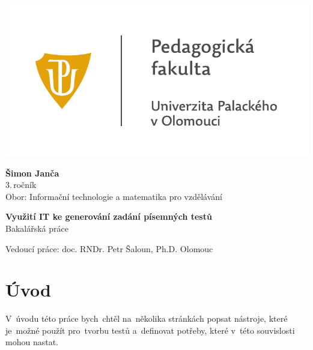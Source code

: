 \documentclass[11pt,a4paper]{report}
\begin{document}
	\begin{titlepage}
		\begin{center}
            {
            \centering
            \includegraphics[]{./img/UP_logo_PdF-UP_horizont_cz.pdf}
            }
			
			\vspace{3cm}

            {
                \LARGE
                \textbf{Šimon Janča}\\
                3.\,ročník\\[8mm]
                Obor: Informační technologie a matematika pro vzdělávání
            }

            \vspace{4cm}
			
			{
			    \textbf{\Huge Využití IT ke generování zadání písemných testů}\\[4mm]
			    \Large
			    Bakalářská práce
			}

            \vfill
            
            {
                Vedoucí práce:
                doc. RNDr. Petr Šaloun, Ph.D.
                \hfill
    			Olomouc \the\year{}
            }
			
		\end{center}
	\end{titlepage}
	\tableofcontents

	\newpage
    \clearpage
    \setcounter{page}{1}
	
	\chapter{Úvod}
        V~úvodu této práce bych~chtěl na~několika stránkách popsat nástroje, které je~možné použít pro~tvorbu testů a~definovat potřeby, které v~této souvislosti mohou nastat.
\end{document}
